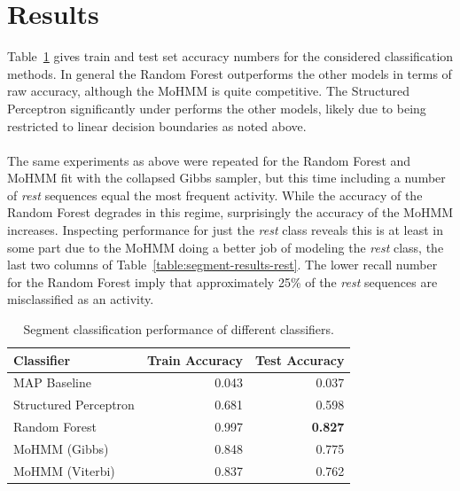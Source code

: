 \documentclass[12pt]{report}
\newcommand{\1}[0]{\mathbbm{1}}
\begin{document}
\section{Results}
Table~\ref{table:segment-results} gives train and test set accuracy numbers for the
considered classification methods. In general the Random Forest outperforms the other
models in terms of raw accuracy, although the \ac{MoHMM} is quite competitive.
The Structured Perceptron significantly under performs the other models,
likely due to being restricted to linear decision boundaries as noted above.
\\\\
The same experiments as above were repeated for the Random Forest and \ac{MoHMM} fit with
the collapsed Gibbs sampler, but this time including a number of \emph{rest} sequences
equal the most frequent activity. While the accuracy of the Random Forest degrades in this regime,
surprisingly the accuracy of the \ac{MoHMM} increases. Inspecting performance for just the \emph{rest} class
reveals this is at least in some part due to the \ac{MoHMM} doing a better job of modeling
the \emph{rest} class, the last two columns of Table~\ref{table:segment-results-rest}.
The lower recall number for the Random Forest imply that approximately 25\% of the \emph{rest}
sequences are misclassified as an activity.
\begin{table}[ht]
    \centering
    \begin{tabular}{l r r}\hline
    \textbf{Classifier} & \textbf{Train Accuracy} &\textbf{Test Accuracy} \\\hline
    MAP Baseline & 0.043 & 0.037 \\
    Structured Perceptron & 0.681 & 0.598 \\
    Random Forest & 0.997 & \textbf{0.827} \\
    MoHMM (Gibbs) & 0.848 & 0.775 \\
    MoHMM (Viterbi) & 0.837 & 0.762 \\
    \end{tabular}
    \caption[Performance on the segmented exercise task]{
        Segment classification performance of different classifiers.
    }
    \label{table:segment-results}
\end{table}
\end{document}
